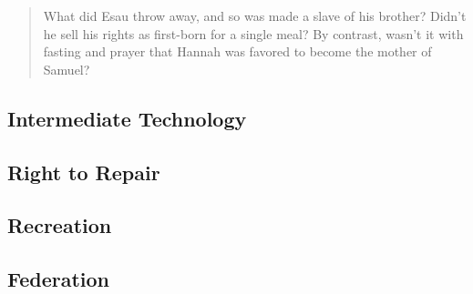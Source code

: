 \documentclass[letterpaper]{article}
\begin{document}
\begin{quote}
  What did Esau throw away, and so was made a slave of his brother? Didn’t he sell his rights as first-born for a single meal? By contrast, wasn’t it with fasting and prayer that Hannah was favored to become the mother of Samuel?
\end{quote}
\fi

\subsection{Intermediate Technology}
\hfill

\hfill

\hfill

\hfill

\hfill

\hfill

\hfill

\subsection{Right to Repair}
\hfill

\hfill

\hfill

\hfill

\hfill

\hfill

\hfill

\subsection{Recreation}
\hfill

\hfill

\hfill

\hfill

\hfill

\hfill

\hfill

\subsection{Federation}
\hfill

\hfill

\hfill

\hfill

\hfill

\hfill

\hfill
\end{document}

